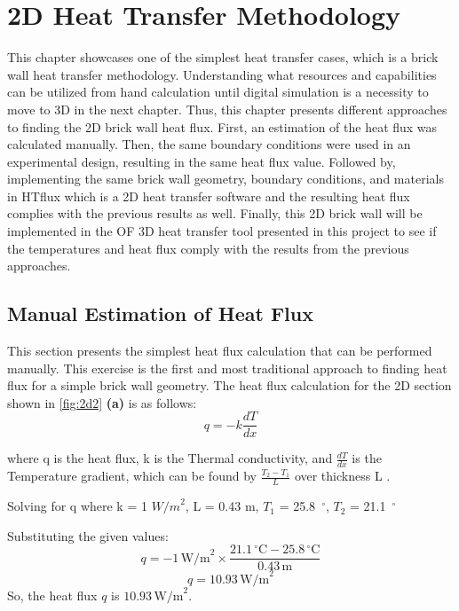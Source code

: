 
\chapter{2D Heat Transfer Methodology}

This chapter showcases one of the simplest heat transfer cases, which is a brick wall heat transfer methodology.
Understanding what resources and capabilities can be utilized from hand calculation until digital simulation is a necessity to move to 3D in the next chapter. Thus, this chapter presents different approaches to finding the 2D brick wall heat flux. First, an estimation of the heat flux was calculated manually. Then, the same boundary conditions were used in an experimental design, resulting in the same heat flux value. Followed by, implementing the same brick wall geometry, boundary conditions, and materials in HTflux which is a 2D heat transfer software and the resulting heat flux complies with the previous results as well. %
Finally, this 2D brick wall will be implemented in the \gls{OF} 3D heat transfer tool presented in this project to see if the temperatures and heat flux comply with the results from the previous approaches. 




\section{Manual Estimation of Heat Flux}
This section presents the simplest heat flux calculation that can be performed manually. This exercise is the first and most traditional approach to finding heat flux for a simple brick wall geometry. The heat flux calculation for the 2D section shown in \ref{fig:2d2} \textbf{(a)} is as follows:
\begin{equation}
q = -k \frac{dT}{dx}
\end{equation}

where q is the heat flux,
k is the Thermal conductivity, and
$\frac{dT}{dx}$ is the Temperature gradient, which can be found by $\frac{T_2 - T_1}{L}$ over thickness L \cite{heattransfund}. 

Solving for q where k = 1 ${W/m}^2$, 
L = 0.43 m,
$T_1$ = 25.8\, $^\circ$, 
$T_2$  = 21.1\, $^\circ$



Substituting the given values:
\[ q = -1 \, \text{W/m}^2 \times \frac{21.1 \, ^\circ \text{C} - 25.8 \, ^\circ \text{C}}{0.43 \, \text{m}} \]
\[ q = 10.93 \, \text{W/m}^2 \]
So, the heat flux \( q \) is \( 10.93 \, \text{W/m}^2 \).





